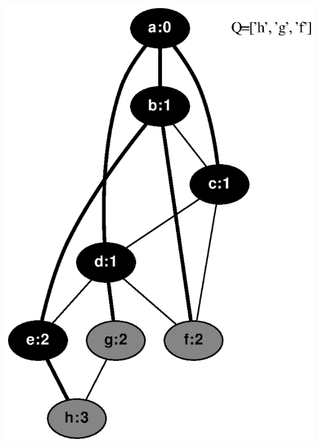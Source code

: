 \documentclass{article}
\begin{document}
\includegraphics[height=.3\textheight]{bfs_undirected_classroom_key_05.eps}
\vspace{1em}
\end{document}
